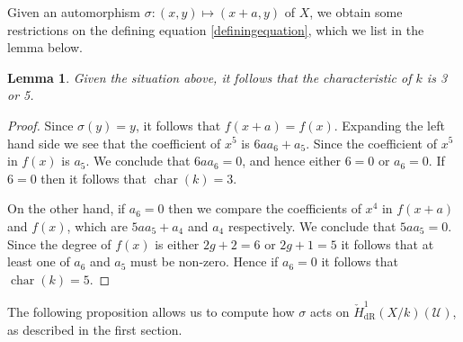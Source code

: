 \documentclass[draft, 11pt]{article} %
\theoremstyle{plain}
\newtheorem{lem}[defn]{Lemma}
\theoremstyle{remark}
\newcommand{\cU}{{\mathcal U}}
\newcommand{\cechderhamhone}{\check{H}_{\text {dR}}^1(X/k)}
\DeclareMathOperator{\cha}{char}
\begin{document}
Given an automorphism $\sigma\colon (x,y) \mapsto (x+a,y)$ of $X$, we obtain some restrictions on the defining equation \eqref{definingequation}, which we list in the lemma below.

\begin{lem}
Given the situation above, it follows that the characteristic of $k$ is 3 or 5.
\end{lem}
\begin{proof}
Since $\sigma(y) = y$, it follows that $f(x+a) = f(x)$.
Expanding the left hand side we see that the coefficient of $x^5$ is $6aa_6 + a_5$.
Since the coefficient of $x^5$ in $f(x)$ is $a_5$.
We conclude that $6aa_6 = 0$, and hence either $6=0$ or $a_6=0$.
If $6=0$ then it follows that $\cha (k)=3$.

On the other hand, if $a_6=0$ then we compare the coefficients of $x^4$ in $f(x+a)$ and $f(x)$, which are $5aa_5+a_4$ and $a_4$ respectively.
We conclude that $5aa_5=0$. Since the degree of $f(x)$ is either $2g+2=6$ or $2g+1=5$ it follows that at least one of $a_6$ and $a_5$ must be non-zero.
Hence if $a_6=0$ it follows that $\cha(k) = 5$.
\end{proof}



The following proposition allows us to compute how $\sigma$ acts on $\cechderhamhone(\cU)$, as described in the first section.
\end{document}
